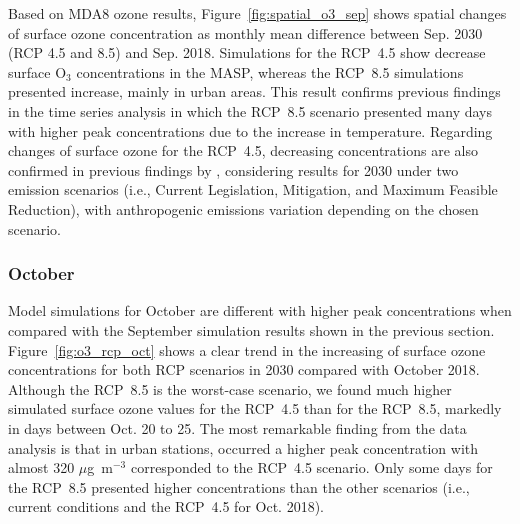 Based on MDA8 ozone results, Figure~\ref{fig:spatial_o3_sep} shows spatial changes of surface ozone concentration as monthly mean difference between Sep. 2030 (RCP 4.5 and 8.5) and Sep. 2018.
Simulations for the RCP~4.5 show decrease surface O$_3$ concentrations in the MASP, whereas the RCP~8.5 simulations presented increase, mainly in urban areas.
This result confirms previous findings in the time series analysis in which the RCP~8.5 scenario presented many days with higher peak concentrations due to the increase in temperature.
Regarding changes of surface ozone for the RCP~4.5, decreasing concentrations are also confirmed in previous findings by \citet{Schuch2020}, considering results for 2030 under two emission scenarios (i.e., Current Legislation, Mitigation, and Maximum Feasible Reduction), with anthropogenic emissions variation depending on the chosen scenario.

\subsubsection{October}
Model simulations for October are different with higher peak concentrations when compared with the September simulation results shown in the previous section.
Figure~\ref{fig:o3_rcp_oct} shows a clear trend in the increasing of surface ozone concentrations for both RCP scenarios in 2030 compared with October 2018.
Although the RCP~8.5 is the worst-case scenario, we found much higher simulated surface ozone values for the RCP~4.5 than for the RCP~8.5, markedly in days between Oct. 20 to 25.
The most remarkable finding from the data analysis is that in urban stations, occurred a higher peak concentration with almost 320 $\mu$g~m$^{-3}$ corresponded to the RCP~4.5 scenario.
Only some days for the RCP~8.5 presented higher concentrations than the other scenarios (i.e., current conditions and the RCP~4.5 for Oct. 2018).

